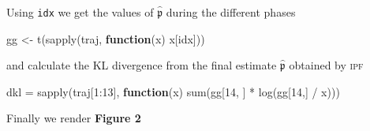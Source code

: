\documentclass[
]{article}
\newenvironment{Shaded}{\begin{snugshade}}{\end{snugshade}}
\newcommand{\ControlFlowTok}[1]{\textcolor[rgb]{0.13,0.29,0.53}{\textbf{#1}}}
\newcommand{\DecValTok}[1]{\textcolor[rgb]{0.00,0.00,0.81}{#1}}
\newcommand{\FunctionTok}[1]{\textcolor[rgb]{0.00,0.00,0.00}{#1}}
\newcommand{\NormalTok}[1]{#1}
\newcommand{\OtherTok}[1]{\textcolor[rgb]{0.56,0.35,0.01}{#1}}
\newcommand{\SpecialCharTok}[1]{\textcolor[rgb]{0.00,0.00,0.00}{#1}}
\newcommand{\prob}[1]{\mathfrak{#1}}
\newcommand{\maxentP}{\hat{\prob p}}
\newcommand{\ipf}{\textsc{ipf}~}
\begin{document}
Using \texttt{idx} we get the values of \(\maxentP\) during the
different phases

\begin{Shaded}
\begin{Highlighting}[]
\NormalTok{gg }\OtherTok{\textless{}{-}} \FunctionTok{t}\NormalTok{(}\FunctionTok{sapply}\NormalTok{(traj, }\ControlFlowTok{function}\NormalTok{(x) x[idx]))}
\end{Highlighting}
\end{Shaded}

and calculate the \textsc{KL} divergence from the final estimate
\(\maxentP\) obtained by \ipf

\begin{Shaded}
\begin{Highlighting}[]
\NormalTok{dkl }\OtherTok{=} \FunctionTok{sapply}\NormalTok{(traj[}\DecValTok{1}\SpecialCharTok{:}\DecValTok{13}\NormalTok{], }\ControlFlowTok{function}\NormalTok{(x) }\FunctionTok{sum}\NormalTok{(gg[}\DecValTok{14}\NormalTok{, ] }\SpecialCharTok{*} \FunctionTok{log}\NormalTok{(gg[}\DecValTok{14}\NormalTok{,] }\SpecialCharTok{/}\NormalTok{ x)))}
\end{Highlighting}
\end{Shaded}

Finally we render \textbf{Figure 2}
\end{document}
